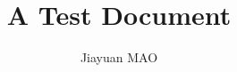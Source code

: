 \documentclass[a4paper, 12pt, titlepage]{article}
\begin{document}
\setlength{\parindent}{2em}                    

\title{A Test \XeLaTex Document}
\author{Jiayuan MAO}
\maketitle

\tableofcontents
\listoffigures
\listoftables


\end{document}
